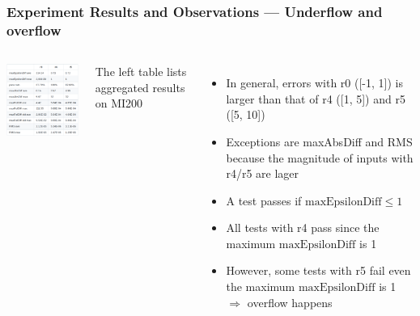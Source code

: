 \documentclass[t, pdftex, aspectratio=169]{beamer}  %
\begin{document}
\begin{frame}
  \frametitle{Experiment Results and Observations --- Underflow and overflow}

  \begin{columns}

    \includegraphics[width=2.3in]{Underflow_overflow}

    The left table lists aggregated results on MI200
    \begin{itemize}
    \item In general, errors with r0 ([-1, 1]) is larger than that of r4 ([1, 5]) and r5 ([5, 10])
    \item Exceptions are maxAbsDiff and RMS\\
      because the magnitude of inputs with r4/r5 are lager
    \item A test passes if $\text{maxEpsilonDiff} \le 1$
    \item All tests with r4 pass since the maximum $\text{maxEpsilonDiff}$ is 1
    \item However, some tests with r5 fail even the maximum $\text{maxEpsilonDiff}$ is 1
      $\Rightarrow$ overflow happens
    \end{itemize}
  \end{columns}
\end{frame}
\end{document}
